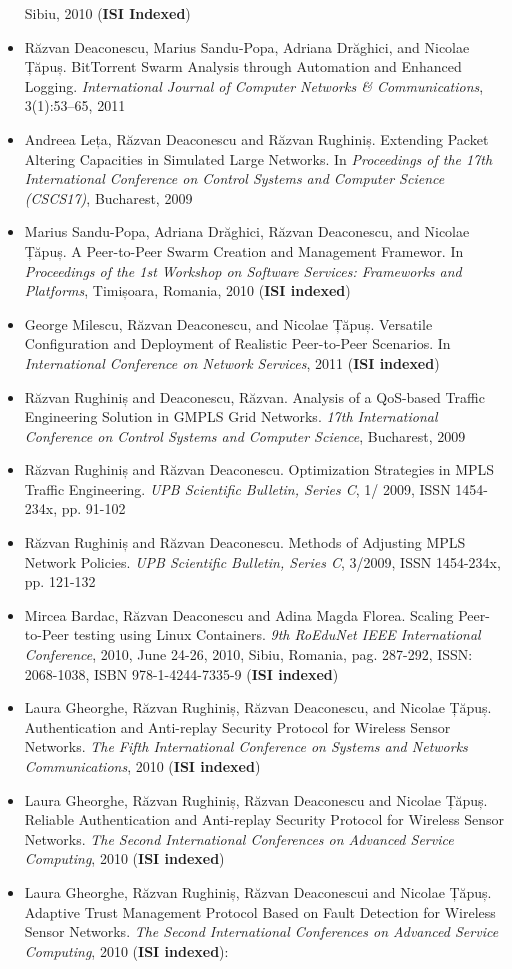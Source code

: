\begin{itemize}
  Sibiu, 2010 (\textbf{ISI Indexed})
  \item Răzvan Deaconescu, Marius Sandu-Popa, Adriana Drăghici, and Nicolae
  Țăpuș. BitTorrent Swarm Analysis through Automation and Enhanced Logging.
  \textit{International Journal of Computer Networks \& Communications},
  3(1):53--65, 2011
  \item Andreea Leța, Răzvan Deaconescu and Răzvan Rughiniș. Extending Packet
  Altering Capacities in Simulated Large Networks. In \textit{Proceedings of
  the 17th International Conference on Control Systems and Computer Science
  (CSCS17)}, Bucharest, 2009
  \item Marius Sandu-Popa, Adriana Drăghici, Răzvan Deaconescu, and Nicolae
  Țăpuș. A Peer-to-Peer Swarm Creation and Management Framewor. In
  \textit{Proceedings of the 1st Workshop on Software Services: Frameworks and
  Platforms}, Timișoara, Romania, 2010 (\textbf{ISI indexed})
  \item George Milescu, Răzvan Deaconescu, and Nicolae Țăpuș. Versatile
  Configuration and Deployment of Realistic Peer-to-Peer Scenarios. In
  \textit{International Conference on Network Services}, 2011 (\textbf{ISI
  indexed})
  \item Răzvan Rughiniș and Deaconescu, Răzvan. Analysis of a QoS-based
  Traffic Engineering Solution in GMPLS Grid Networks. \textit{17th
  International Conference on Control Systems and Computer Science},
  Bucharest, 2009
  \item Răzvan Rughiniș and Răzvan Deaconescu. Optimization Strategies in MPLS
  Traffic Engineering. \textit{UPB Scientific Bulletin, Series C}, 1/ 2009,
  ISSN 1454-234x, pp. 91-102
  \item Răzvan Rughiniș and Răzvan Deaconescu. Methods of Adjusting MPLS
  Network Policies. \textit{UPB Scientific Bulletin, Series C}, 3/2009, ISSN
  1454-234x, pp. 121-132
  \item Mircea Bardac, Răzvan Deaconescu and Adina Magda Florea. Scaling
  Peer-to-Peer testing using Linux Containers. \textit{9th RoEduNet IEEE
  International Conference}, 2010, June 24-26, 2010, Sibiu, Romania, pag.
  287-292, ISSN: 2068-1038, ISBN 978-1-4244-7335-9 (\textbf{ISI indexed})
  \item Laura Gheorghe, Răzvan Rughiniș, Răzvan Deaconescu, and Nicolae Țăpuș.
  Authentication and Anti-replay Security Protocol for Wireless Sensor
  Networks. \textit{The Fifth International Conference on Systems and Networks
  Communications}, 2010 (\textbf{ISI indexed})
  \item Laura Gheorghe, Răzvan Rughiniș, Răzvan Deaconescu and Nicolae Țăpuș.
  Reliable Authentication and Anti-replay Security Protocol for Wireless
  Sensor Networks. \textit{The Second International Conferences on Advanced
  Service Computing}, 2010 (\textbf{ISI indexed})
  \item Laura Gheorghe, Răzvan Rughiniș, Răzvan Deaconescui and Nicolae Țăpuș.
  Adaptive Trust Management Protocol Based on Fault Detection for Wireless
  Sensor Networks. \textit{The Second International Conferences on Advanced
  Service Computing}, 2010 (\textbf{ISI indexed}):
\end{itemize}
